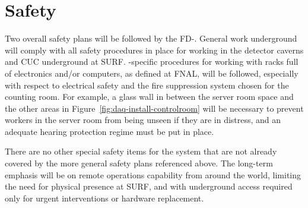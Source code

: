\section{Safety}
\label{sec:fd-daq-safety}

Two overall safety plans will be followed by the FD-. General work underground will comply with all safety procedures in place for working in the detector caverns and CUC underground at SURF. -specific procedures for working with racks full of electronics and/or computers, as defined at FNAL, will be followed, especially with respect to electrical safety and the fire suppression system chosen for the counting room. For example, a glass wall in between the server room space and the other areas in Figure~\ref{fig:daq-install-controlroom} will be necessary to prevent workers in the server room from being unseen if they are in distress, and an adequate hearing protection regime must be put in place.

There are no other special safety items for the  system that are not already covered by the more general safety plans referenced above. The long-term emphasis will be on remote operations capability from around the world, limiting the need for physical presence at SURF, and with underground access required only for urgent interventions or hardware replacement.
